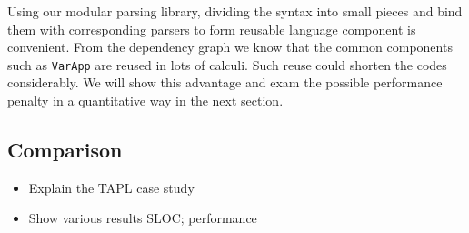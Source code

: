 Using our modular parsing library, dividing the syntax into small pieces and bind them with corresponding parsers to form reusable language component is convenient. From the dependency graph we know that the common components such as \lstinline{VarApp} are reused in lots of calculi. Such reuse could shorten the codes considerably. We will show this advantage and exam the possible performance penalty in a quantitative way in the next section.

\subsection{Comparison}\label{subsec:cs-comparison}

\begin{itemize}
\item Explain the TAPL case study
\item Show various results SLOC; performance
\end{itemize}
